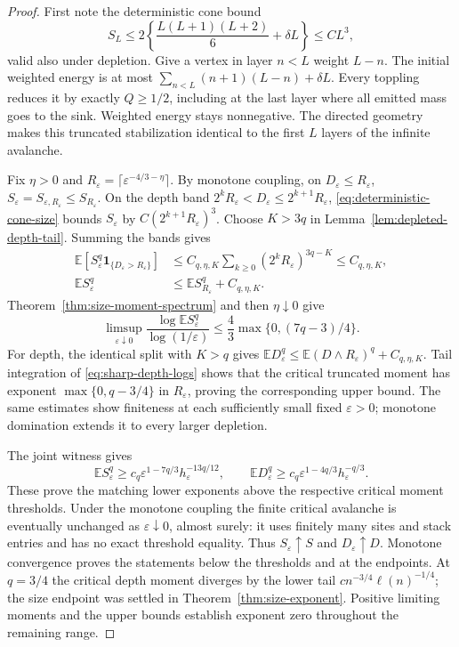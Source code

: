 \documentclass[11pt]{article}
\numberwithin{equation}{section}
\theoremstyle{definition}
\newcommand{\E}{\mathbb E}
\newcommand{\ind}{\mathbf 1}
\begin{document}
\begin{proof}
First note the deterministic cone bound
\begin{equation}\label{eq:deterministic-cone-size}
 S_L\le2\left\{\frac{L(L+1)(L+2)}6+\delta L\right\}\le C L^3,
\end{equation}
valid also under depletion. Give a vertex in layer $n<L$ weight $L-n$. The initial weighted energy is at most $\sum_{n<L}(n+1)(L-n)+\delta L$. Every toppling reduces it by exactly $Q\ge1/2$, including at the last layer where all emitted mass goes to the sink. Weighted energy stays nonnegative. The directed geometry makes this truncated stabilization identical to the first $L$ layers of the infinite avalanche.

Fix $\eta>0$ and $R_\varepsilon=\lceil\varepsilon^{-4/3-\eta}\rceil$. By monotone coupling, on $D_\varepsilon\le R_\varepsilon$,
$S_\varepsilon=S_{\varepsilon,R_\varepsilon}\le S_{R_\varepsilon}$.
On the depth band $2^kR_\varepsilon<D_\varepsilon\le2^{k+1}R_\varepsilon$, \eqref{eq:deterministic-cone-size} bounds $S_\varepsilon$ by $C(2^{k+1}R_\varepsilon)^3$. Choose $K>3q$ in Lemma~\ref{lem:depleted-depth-tail}. Summing the bands gives
\begin{align*}
 \E[S_\varepsilon^q\ind_{\{D_\varepsilon>R_\varepsilon\}}]
 &\le C_{q,\eta,K}\sum_{k\ge0}
 (2^kR_\varepsilon)^{3q-K}\le C_{q,\eta,K},\\
 \E S_\varepsilon^q&\le\E S_{R_\varepsilon}^q+C_{q,\eta,K}.
\end{align*}
Theorem~\ref{thm:size-moment-spectrum} and then $\eta\downarrow0$ give
\[
 \limsup_{\varepsilon\downarrow0}
 \frac{\log\E S_\varepsilon^q}{\log(1/\varepsilon)}
 \le\frac43\max\{0,(7q-3)/4\}.
\]
For depth, the identical split with $K>q$ gives
$\E D_\varepsilon^q\le\E(D\wedge R_\varepsilon)^q+C_{q,\eta,K}$.
Tail integration of \eqref{eq:sharp-depth-logs} shows that the critical truncated moment has exponent $\max\{0,q-3/4\}$ in $R_\varepsilon$, proving the corresponding upper bound. The same estimates show finiteness at each sufficiently small fixed $\varepsilon>0$; monotone domination extends it to every larger depletion.

The joint witness gives
\[
 \E S_\varepsilon^q\ge c_q\varepsilon^{1-7q/3}h_\varepsilon^{-13q/12},
 \qquad
 \E D_\varepsilon^q\ge c_q\varepsilon^{1-4q/3}h_\varepsilon^{-q/3}.
\]
These prove the matching lower exponents above the respective critical moment thresholds. Under the monotone coupling the finite critical avalanche is eventually unchanged as $\varepsilon\downarrow0$, almost surely: it uses finitely many sites and stack entries and has no exact threshold equality. Thus $S_\varepsilon\uparrow S$ and $D_\varepsilon\uparrow D$. Monotone convergence proves the statements below the thresholds and at the endpoints. At $q=3/4$ the critical depth moment diverges by the lower tail $c n^{-3/4}\ell(n)^{-1/4}$; the size endpoint was settled in Theorem~\ref{thm:size-exponent}. Positive limiting moments and the upper bounds establish exponent zero throughout the remaining range.


\end{proof}
\end{document}

